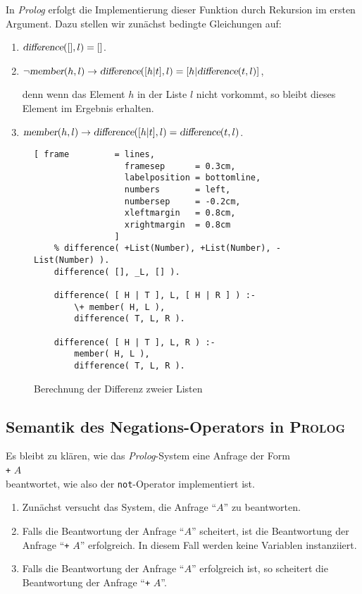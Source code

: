 \noindent
In \textsl{Prolog} erfolgt die Implementierung dieser Funktion durch Rekursion im ersten Argument.
Dazu stellen wir zun\"{a}chst bedingte Gleichungen auf:
\begin{enumerate}
\item $\textsl{difference}([], l) = []$.
\item $\neg \textsl{member}(h, l) \rightarrow \textsl{difference}([h|t], l) = [h |\textsl{difference}(t,l)]$,

      denn wenn das Element $h$ in der Liste $l$ nicht vorkommt, so bleibt dieses Element
      im Ergebnis erhalten.
\item $     \textsl{member}(h, l) \rightarrow \textsl{difference}([h|t], l) = \textsl{difference}(t,l)$.
\end{enumerate}

\begin{figure}[!h]
  \centering
\begin{Verbatim}[ frame         = lines, 
                  framesep      = 0.3cm, 
                  labelposition = bottomline,
                  numbers       = left,
                  numbersep     = -0.2cm,
                  xleftmargin   = 0.8cm,
                  xrightmargin  = 0.8cm
                ]
    % difference( +List(Number), +List(Number), -List(Number) ).
    difference( [], _L, [] ).
    
    difference( [ H | T ], L, [ H | R ] ) :-
    	\+ member( H, L ),
    	difference( T, L, R ).
    
    difference( [ H | T ], L, R ) :-
    	member( H, L ),
    	difference( T, L, R ).
\end{Verbatim}
\vspace*{-0.3cm}
  \caption{Berechnung der Differenz zweier Listen}
  \label{fig:difference}
\end{figure}

\subsection{Semantik des Negations-Operators in \textsc{Prolog}}
Es bleibt zu kl\"{a}ren, wie das \textsl{Prolog}-System eine Anfrage der Form
\\[0.1cm]
\hspace*{1.3cm} \texttt{+} $A$ \\[0.1cm]
beantwortet, wie also der \texttt{not}-Operator implementiert ist.
\begin{enumerate}
\item Zun\"{a}chst versucht das System, die Anfrage ``$A$'' zu beantworten.
\item Falls die Beantwortung der Anfrage ``$A$'' scheitert, ist die Beantwortung
      der Anfrage ``\texttt{+} $A$'' erfolgreich.  In diesem Fall werden keine
      Variablen instanziiert.
\item Falls die Beantwortung der Anfrage ``$A$'' erfolgreich ist, so scheitert die Beantwortung
      der Anfrage ``\texttt{+} $A$''.
\end{enumerate}

